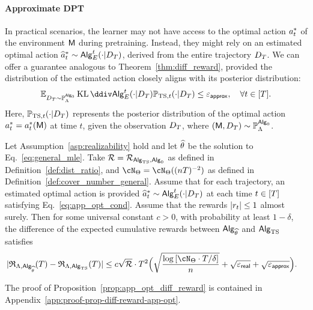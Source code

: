 \paragraph{Approximate DPT} In practical scenarios, the learner may not have access to the optimal action ${a}^*_t$ of the environment ${\mathsf{M}}$ during pretraining. Instead, they might rely on an estimated optimal action $\widehat{{a}}_t^* \sim {\mathsf{Alg}}_{{E}}^t(\cdot | {D}_{T})$, derived from the entire trajectory ${D}_{T}$. We can offer a guarantee analogous to Theorem~\ref{thm:diff_reward}, provided the distribution of the estimated action closely aligns with its posterior distribution:
\begin{align}\E_{\dset_\totlen\sim\P_{\prior}^{\sAlg_0}}\KL{\sAlg_{\shortexp}^t(\cdot | \dset_\totlen)}{\P_{\TS,t}(\cdot|\dset_\totlen)}\leq\appeps,~~~ \forall t \in [\totlen].
\label{eq:app_opt_cond}
\end{align}
Here, $\mathbb{P}_{{\mathrm{TS}},t}(\cdot|{D}_{T})$ represents the posterior distribution of the optimal action ${a}^*_t={a}^*_t({\mathsf{M}})$ at time $t$, given the observation ${D}_{T}$, where $({\mathsf{M}}, {D}_{T}) \sim \mathbb{P}_{\Lambda}^{{\mathsf{Alg}}_0}$.


\begin{proposition}\label{prop:app_opt_diff_reward} Let Assumption~\ref{asp:realizability} hold and let ${\widehat{\theta}}$ be the solution to Eq.~\eqref{eq:general_mle}. Take ${\mathcal{R}} = {\mathcal{R}}_{{\mathsf{Alg}}_{\mathrm{TS}},{\mathsf{Alg}}_0}$ as defined in Definition~\ref{def:dist_ratio}, and $\cN_{\Parspace} = \cN_{\Parspace}((\Numobs\totlen)^{-2})$  as defined in Definition~\ref{def:cover_number_general}. Assume that for each trajectory, an estimated optimal action is provided $\widehat{{a}}_t^* \sim {\mathsf{Alg}}_{{E}}^t(\cdot | {D}_{T})$ at each time $t\in[{T}]$ satisfying Eq.~\eqref{eq:app_opt_cond}.
Assume that the rewards $|{r}_t|\leq 1$  almost surely. Then for some universal constant $c>0$, with probability at least $1-\delta$, the difference of the expected cumulative rewards between ${\mathsf{Alg}}_{\widehat{\theta}}$ and ${\mathsf{Alg}}_{\mathrm{TS}}$ satisfies
\begin{align*}
|\totreward_{\prior,\sAlg_\EstPar}(\totlen)-\totreward_{\prior,\sAlg_\TS}(\totlen)|
&\leq
c \sqrt{\distratio}\cdot\totlen^2 \Big( \sqrt{\frac{\log \brac{ \cN_{\Parspace} \cdot \totlen/\delta } }{n} } + \sqrt{\geneps} + \sqrt{\appeps} \Big).
\end{align*}
\end{proposition}
The proof of Proposition~\ref{prop:app_opt_diff_reward} is contained in Appendix~\ref{app:proof-prop-diff-reward-app-opt}.





